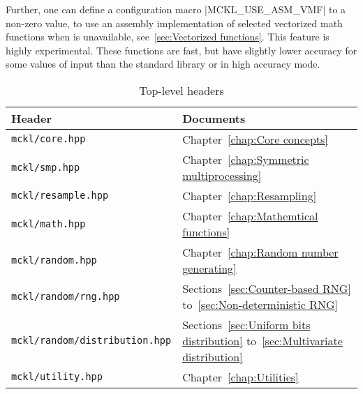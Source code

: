 Further, one can define a configuration macro |MCKL_USE_ASM_VMF| to a non-zero
value, to use an assembly implementation of selected vectorized math functions
when \mkl \vml is unavailable, see~\ref{sec:Vectorized functions}. This feature
is highly experimental. These functions are fast, but have slightly lower
accuracy for some values of input than the standard library or \mkl \vml in
high accuracy mode.

\begin{table}[ht]
  \begin{tabularx}{\textwidth}{LL}
    \toprule
    Header & Documents \\
    \midrule
    \texttt{mckl/core.hpp}     & Chapter~\ref{chap:Core concepts}             \\
    \texttt{mckl/smp.hpp}      & Chapter~\ref{chap:Symmetric multiprocessing} \\
    \texttt{mckl/resample.hpp} & Chapter~\ref{chap:Resampling}                \\
    \texttt{mckl/math.hpp}     & Chapter~\ref{chap:Mathemtical functions}     \\
    \texttt{mckl/random.hpp}   & Chapter~\ref{chap:Random number generating}  \\
    \texttt{mckl/random/rng.hpp}
    & Sections~\ref{sec:Counter-based RNG}
    to~\ref{sec:Non-deterministic RNG} \\
    \texttt{mckl/random/distribution.hpp}
    & Sections~\ref{sec:Uniform bits distribution}
    to~\ref{sec:Multivariate distribution} \\
    \texttt{mckl/utility.hpp} & Chapter~\ref{chap:Utilities} \\
    \bottomrule
  \end{tabularx}
  \caption{Top-level headers}
  \label{tab:headers}
\end{table}
